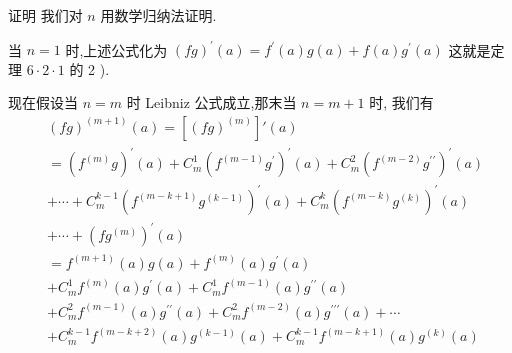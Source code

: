 证明 我们对 $n$ 用数学归纳法证明.

当 $n = 1$ 时,上述公式化为 ${\left( fg\right) }^{\prime }\left( a\right)  = {f}^{\prime }\left( a\right) g\left( a\right)  + f\left( a\right) {g}^{\prime }\left( a\right)$ 这就是定理 $6 \cdot  2 \cdot  1$ 的 2 ).

现在假设当 $n = m$ 时 Leibniz 公式成立,那末当 $n = m + 1$ 时, 我们有
\begin{align*}
	&{\left( fg\right) }^{\left( m + 1\right) }\left( a\right)  = \left\lbrack  {\left( fg\right) }^{\left( m\right) }\right\rbrack  \prime \left( a\right)\\
	&= {\left( {f}^{\left( m\right) }g\right) }^{\prime }\left( a\right)  + {C}_{m}^{1}{\left( {f}^{\left( m - 1\right) }{g}^{\prime }\right) }^{\prime }\left( a\right)  + {C}_{m}^{2}{\left( {f}^{\left( m - 2\right) }{g}^{\prime \prime }\right) }^{\prime }\left( a\right)\\
	&+ \cdots  + {C}_{m}^{k - 1}{\left( {f}^{\left( m - k + 1\right) }{g}^{\left( k - 1\right) }\right) }^{\prime }\left( a\right)  + {C}_{m}^{k}{\left( {f}^{\left( m - k\right) }{g}^{\left( k\right) }\right) }^{\prime }\left( a\right)\\
	&+ \cdots  + {\left( f{g}^{\left( m\right) }\right) }^{\prime }\left( a\right)\\
	&= {f}^{\left( m + 1\right) }\left( a\right) g\left( a\right)  + {f}^{\left( m\right) }\left( a\right) {g}^{\prime }\left( a\right)\\
	&+ {C}_{m}^{1}{f}^{\left( m\right) }\left( a\right) {g}^{\prime }\left( a\right)  + {C}_{m}^{1}{f}^{\left( m - 1\right) }\left( a\right) {g}^{\prime \prime }\left( a\right)\\
	&+ {C}_{m}^{2}{f}^{\left( m - 1\right) }\left( a\right) {g}^{\prime \prime }\left( a\right)  + {C}_{m}^{2}{f}^{\left( m - 2\right) }\left( a\right) {g}^{\prime \prime \prime }\left( a\right)  + \cdots\\
	&+ {C}_{m}^{k - 1}{f}^{\left( m - k + 2\right) }\left( a\right) {g}^{\left( k - 1\right) }\left( a\right)  + {C}_{m}^{k - 1}{f}^{\left( m - k + 1\right) }\left( a\right) {g}^{\left( k\right) }\left( a\right)
\end{align*}
